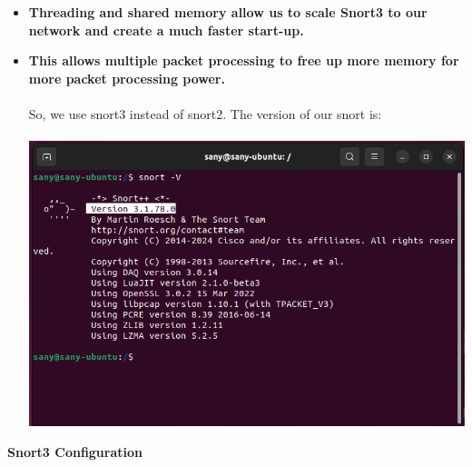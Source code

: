 \documentclass{article}
\begin{document}
\clearpage
\begin{itemize}
    \item \textbf{Threading and shared memory allow us to scale Snort3 to our network and create a much faster start-up.}
    \item \textbf{This allows multiple packet processing to free up more memory for more packet processing power.}\\\\
    So, we use snort3 instead of snort2. The version of our snort is:\\\\
    \includegraphics[width=1.0\textwidth]{images/snort_version.PNG}
\end{itemize}
\clearpage
\textbf{Snort3 Configuration}
\end{document}
